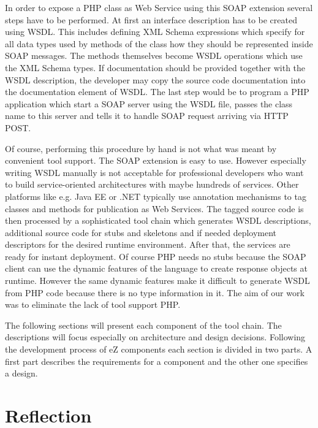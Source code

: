 \documentclass[10pt,final,a4paper,oneside]{article}
\begin{document}
In order to expose a PHP class as Web Service using this SOAP extension
several steps have to be performed.
At first an interface description has to be created using WSDL. This includes
defining XML Schema expressions \cite{XMLSchema} which specify for all data types
used by methods of the class how they should be represented inside SOAP messages.
The methods themselves become WSDL operations which use the XML Schema types.
If documentation should be provided together with the WSDL description,
the developer may copy the source code documentation into the
documentation element of WSDL.
The last step would be to program a PHP application which start a SOAP server
using the WSDL file, passes the class name to this server and tells it to
handle SOAP request arriving via HTTP POST.

Of course, performing this procedure by hand is not what was meant by
convenient tool support.
The SOAP extension is easy to use. However especially writing WSDL manually is not
acceptable for professional developers who want to build service-oriented
architectures with maybe hundreds of services. Other platforms like e.g.
Java EE or .NET typically use annotation mechanisms to tag classes and methods
for publication as Web Services. The tagged source code is then processed by a
sophisticated tool chain which generates WSDL descriptions, additional source code
for stubs and skeletons and if needed deployment descriptors for the desired
runtime environment.
After that, the services are ready for instant deployment.
Of course PHP needs no stubs because the SOAP client can use the dynamic
features of the language to create response objects at runtime.
However the same dynamic features make it difficult to generate WSDL from PHP
code because there is no type information in it.
The aim of our work was to eliminate the lack of tool support PHP.

The following sections will present each component of the tool chain.
The descriptions will focus especially on architecture and design decisions.
Following the development process of eZ components each section is divided in
two parts.
A first part describes the requirements for a component and the other one
specifies a design.



\section{Reflection}\label{sec:Reflection}
%
\end{document}
